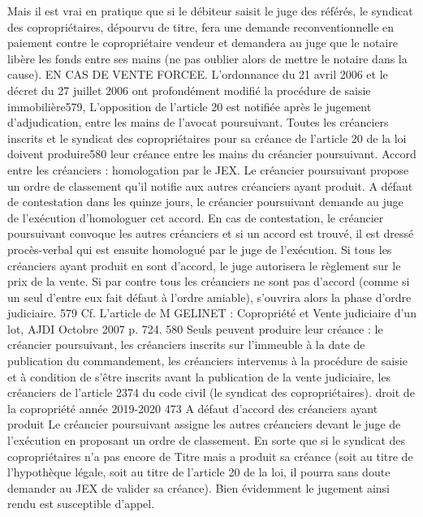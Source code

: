 Mais il est vrai en pratique que si le débiteur saisit le juge des référés, le syndicat des copropriétaires, dépourvu de titre, fera une demande reconventionnelle en paiement contre le copropriétaire vendeur et demandera au juge que le notaire libère les fonds entre ses mains (ne pas oublier alors de mettre le notaire dans la cause).
EN CAS DE VENTE FORCEE.
L'ordonnance du 21 avril 2006 et le décret du 27 juillet 2006 ont profondément modifié la procédure de saisie immobilière579,
L'opposition de l'article 20 est notifiée après le jugement d'adjudication, entre les mains de l'avocat poursuivant.
Toutes les créanciers inscrits et le syndicat des copropriétaires pour sa créance de l’article 20 de la loi doivent produire580 leur créance entre les mains du créancier poursuivant.
\degres Accord entre les créanciers : homologation par le JEX.
Le créancier poursuivant propose un ordre de classement qu’il notifie aux autres créanciers ayant produit. A défaut de contestation dans les quinze jours, le créancier poursuivant demande au juge de l’exécution d’homologuer cet accord. En cas de contestation, le créancier poursuivant convoque les autres créanciers et si un accord est trouvé, il est dressé procès-verbal qui est ensuite homologué par le juge de l’exécution. Si tous les créanciers ayant produit en sont d'accord, le juge autorisera le règlement sur le prix de la vente.
Si par contre tous les créanciers ne sont pas d'accord (comme si un seul d'entre eux fait défaut à l'ordre amiable), s'ouvrira alors la phase d'ordre judiciaire.
579 Cf. L’article de M GELINET : Copropriété et Vente judiciaire d’un lot, AJDI Octobre 2007 p. 724.
580 Seuls peuvent produire leur créance : le créancier poursuivant, les créanciers inscrits sur l’immeuble à la date de publication du commandement, les créanciers intervenus à la procédure de saisie et à condition de s’être inscrits avant la publication de la vente judiciaire, les créanciers de l’article 2374 du code civil (le syndicat des copropriétaires).
droit de la copropriété année 2019-2020
473
\degres A défaut d’accord des créanciers ayant produit
Le créancier poursuivant assigne les autres créanciers devant le juge de l’exécution en proposant un ordre de classement.
En sorte que si le syndicat des copropriétaires n'a pas encore de Titre mais a produit sa créance (soit au titre de l’hypothèque légale, soit au titre de l’article 20 de la loi, il pourra sans doute demander au JEX de valider sa créance).
Bien évidemment le jugement ainsi rendu est susceptible d'appel.